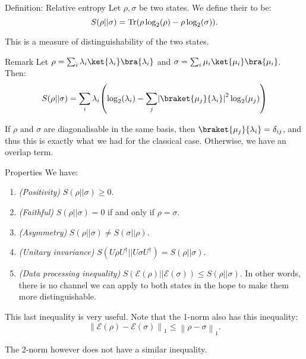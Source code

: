 \documentclass[a4paper]{article}
\begin{document}
\begin{parag}{Definition: Relative entropy}
    Let $\rho, \sigma$ be two states. We define their  to be:
    \[S\left(\rho || \sigma\right) = \Tr\left(\rho \log_2\left(\rho\right) - \rho \log_2\left(\sigma\right)\right).\]

    This is a measure of distinguishability of the two states.

    \begin{subparag}{Remark}
        Let $\rho = \sum_{i} \lambda_i \ket{\lambda_i}\bra{\lambda_i}$ and $\sigma = \sum_{i} \mu_i \ket{\mu_i}\bra{\mu_i}$. Then: 
        \[S\left(\rho || \sigma\right) = \sum_{i} \lambda_i\left(\log_2\left(\lambda_i\right) - \sum_{j} \left|\braket{\mu_j}{\lambda_i}\right|^2 \log_2\left(\mu_j\right)\right)\]
        

        If $\rho$ and $\sigma$ are diagonalisable in the same basis, then $\braket{\mu_j}{\lambda_i} = \delta_{ij}$, and thus this is exactly what we had for the classical case. Otherwise, we have an overlap term.
    \end{subparag}

    \begin{subparag}{Properties}
        We have: 
        \begin{enumerate}[left=0pt]
            \item \textit{(Positivity)} $S\left(\rho || \sigma\right) \geq 0$.
            \item \textit{(Faithful)} $S\left(\rho || \sigma\right) = 0$ if and only if $\rho = \sigma$.
            \item \textit{(Asymmetry)} $S\left(\rho || \sigma\right) \neq S\left(\sigma || \rho\right)$.
            \item \textit{(Unitary invariance)} $S\left(U \rho U^{\dagger} || U \sigma U^{\dagger}\right) = S\left(\rho || \sigma\right)$.
            \item \textit{(Data processing inequality)} $S\left(\mathcal{E}\left(\rho\right) || \mathcal{E}\left(\sigma\right)\right) \leq S\left(\rho || \sigma\right)$. In other words, there is no channel we can apply to both states in the hope to make them more distinguishable.
        \end{enumerate}
        
        This last inequality is very useful. Note that the 1-norm also has this inequality: 
        \[\left\|\mathcal{E}\left(\rho\right) - \mathcal{E}\left(\sigma\right)\right\|_1 \leq \left\|\rho - \sigma\right\|_1.\]

        The 2-norm however does not have a similar inequality.
    \end{subparag}
\end{parag}
\end{document}
